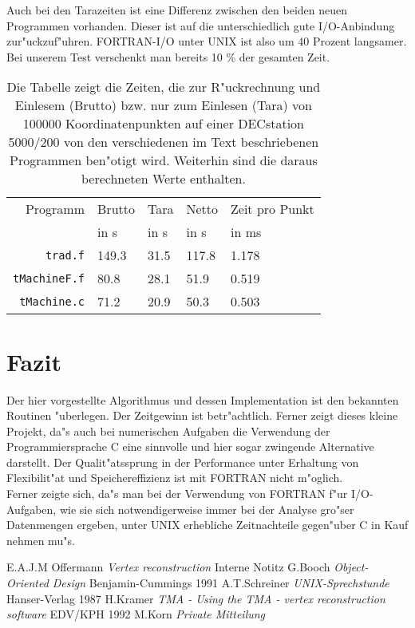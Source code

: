 Auch bei den Tarazeiten ist eine Differenz zwischen den beiden neuen 
Programmen vorhanden. Dieser ist
auf die unterschiedlich gute I/O-Anbindung zur"uckzuf"uhren. 
FORTRAN-I/O  unter UNIX ist also um  40 Prozent langsamer. 
Bei unserem Test verschenkt man bereits 10 \% der gesamten Zeit.
\begin{table}
\begin{center}
\begin{tabular}{|r|l|l|l|l|}
\hline
Programm & Brutto & Tara & Netto & Zeit pro Punkt \\
         & in s   & in s & in s  & in ms \\
\hline 
{\tt trad.f}      &   149.3 &   31.5 & 117.8 &   1.178 \\
{\tt tMachineF.f} &    80.8 &   28.1 &  51.9 &   0.519 \\
{\tt tMachine.c}  &    71.2 &   20.9 &  50.3 &   0.503 \\
\hline 
\end{tabular}
\end{center}
\caption{
        Die Tabelle zeigt die Zeiten, die zur 
        R"uckrechnung und Einlesem (Brutto) bzw. nur zum 
        Einlesen (Tara) von 100000 Koordinatenpunkten auf 
        einer DECstation 5000/200 von den verschiedenen 
        im Text beschriebenen Programmen ben"otigt wird. 
        Weiterhin sind die daraus berechneten
        Werte enthalten.
        }
\label{bench}
\end{table}

\section{Fazit}
Der hier vorgestellte Algorithmus und dessen Implementation ist den
bekannten Routinen "uberlegen. Der Zeitgewinn ist betr"achtlich. Ferner
zeigt dieses kleine Projekt, da"s auch bei numerischen Aufgaben die 
Verwendung der Programmiersprache C eine sinnvolle und hier sogar zwingende 
Alternative darstellt. Der Qualit"atssprung in der Performance unter 
Erhaltung von Flexibilit"at und Speichereffizienz ist mit FORTRAN nicht 
m"oglich. 
\\
Ferner zeigte sich, da"s man bei der Verwendung von FORTRAN f"ur I/O-Aufgaben,
 wie sie sich notwendigerweise immer bei der Analyse gro"ser Datenmengen 
ergeben, unter UNIX erhebliche Zeitnachteile gegen"uber C in Kauf nehmen mu"s.

\begin{thebibliography}{99}
E.A.J.M Offermann {\sl Vertex reconstruction}  Interne Notitz
G.Booch {\sl Object-Oriented Design}    Benjamin-Cummings 1991
A.T.Schreiner {\sl UNIX-Sprechstunde} Hanser-Verlag 1987
H.Kramer {\sl TMA - Using the TMA - vertex reconstruction software} 
        EDV/KPH 1992
M.Korn {\sl Private Mitteilung}
\end{thebibliography}

